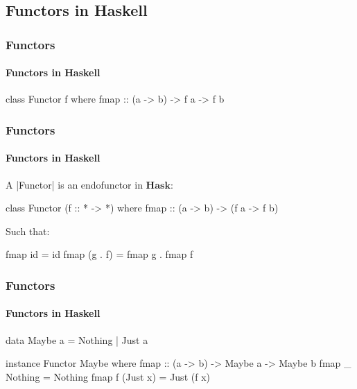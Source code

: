 \documentclass{beamer}
\newcommand{\catbf}[1]{\ensuremath{\mathbf{#1}}\xspace}
\newcommand{\hask}{\catbf{Hask}}
\begin{document}

\subsection{Functors in Haskell}


\begin{frame}[fragile]
  \frametitle{Functors}
  \framesubtitle{Functors in Haskell}

  \begin{definition}
    \begin{code}
class Functor f where
  fmap :: (a -> b) -> f a -> f b
    \end{code}
  \end{definition}

\end{frame}


\begin{frame}[fragile]
  \frametitle{Functors}
  \framesubtitle{Functors in Haskell}

  \begin{definition}
    A |Functor| is an endofunctor in \hask:
    \begin{code}
class Functor (f :: * -> *) where
  fmap :: (a -> b) -> (f a -> f b)
    \end{code}
    Such that:
    \begin{code}
fmap id      = id
fmap (g . f) = fmap g . fmap f
    \end{code}
  \end{definition}

\end{frame}


\begin{frame}[fragile]
  \frametitle{Functors}
  \framesubtitle{Functors in Haskell}

  \begin{example}
    \begin{code}
data Maybe a = Nothing | Just a

instance Functor Maybe where
  fmap :: (a -> b) -> Maybe a -> Maybe b
  fmap _ Nothing  = Nothing
  fmap f (Just x) = Just (f x)
    \end{code}
  \end{example}

\end{frame}
\end{document}
